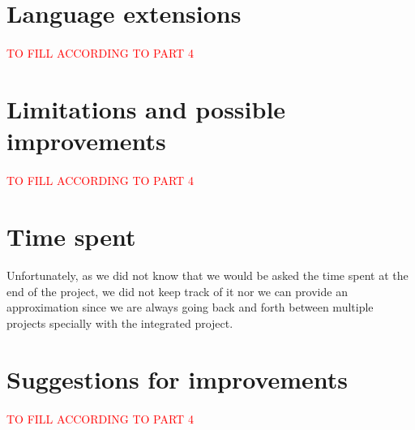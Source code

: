 \documentclass[a4paper, 11pt, oneside]{article}
\begin{document}

\section{Language extensions}
\paragraph{}\textcolor{red}{TO FILL ACCORDING TO PART 4}


\section{Limitations and possible improvements}
\paragraph{}\textcolor{red}{TO FILL ACCORDING TO PART 4}


\section{Time spent}
\paragraph{}Unfortunately, as we did not know that we would be asked the time spent at the end of the project, we did not keep track of it nor we can provide an approximation since we are always going back and forth between multiple projects specially with the integrated project.


\section{Suggestions for improvements}
\paragraph{}\textcolor{red}{TO FILL ACCORDING TO PART 4}

 
\end{document}

